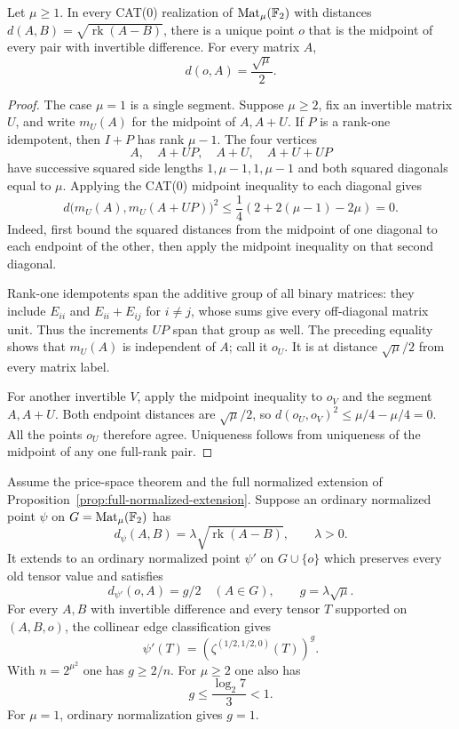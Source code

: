 \begin{lemma}
\label{lem:rank-metric-common-centre}
Let $\mu\ge1$. In every CAT(0) realization of
$\operatorname{Mat}_{\mu}(\mathbb F_2)$ with distances
$d(A,B)=\sqrt{\operatorname{rk}(A-B)}$, there is a unique point $o$
that is the midpoint of every pair with invertible difference.
For every matrix $A$,
\[
 d(o,A)=\frac{\sqrt\mu}{2}.
\]
\end{lemma}

\begin{proof}
The case $\mu=1$ is a single segment. Suppose $\mu\ge2$, fix an
invertible matrix $U$, and write $m_U(A)$ for the midpoint of
$A,A+U$. If $P$ is a rank-one idempotent, then $I+P$ has rank
$\mu-1$. The four vertices
\[
 A,\quad A+UP,\quad A+U,\quad A+U+UP
\]
have successive squared side lengths $1,\mu-1,1,\mu-1$ and both
squared diagonals equal to $\mu$. Applying the CAT(0) midpoint
inequality to each diagonal gives
\[
 d\bigl(m_U(A),m_U(A+UP)\bigr)^2
 \leq\frac14\left(2+2(\mu-1)-2\mu\right)=0.
\]
Indeed, first bound the squared distances from the midpoint of one
diagonal to each endpoint of the other, then apply the midpoint
inequality on that second diagonal.

Rank-one idempotents span the additive group of all binary matrices:
they include $E_{ii}$ and $E_{ii}+E_{ij}$ for $i\ne j$, whose sums
give every off-diagonal matrix unit. Thus the increments $UP$ span
that group as well. The preceding equality shows that $m_U(A)$ is
independent of $A$; call it $o_U$. It is at distance $\sqrt\mu/2$
from every matrix label.

For another invertible $V$, apply the midpoint inequality to $o_V$
and the segment $A,A+U$. Both endpoint distances are $\sqrt\mu/2$,
so $d(o_U,o_V)^2\leq\mu/4-\mu/4=0$. All the points $o_U$ therefore
agree. Uniqueness follows from uniqueness of the midpoint of any
one full-rank pair.
\end{proof}

\begin{proposition}
\label{prop:rank-centre-spectrum}
Assume the price-space theorem and the full normalized extension
of Proposition~\ref{prop:full-normalized-extension}. Suppose an
ordinary normalized point $\psi$ on
$G=\operatorname{Mat}_{\mu}(\mathbb F_2)$ has
\[
 d_\psi(A,B)=\lambda\sqrt{\operatorname{rk}(A-B)},\qquad\lambda>0.
\]
It extends to an ordinary normalized point $\psi'$ on $G\cup\{o\}$
which preserves every old tensor value and satisfies
\[
 d_{\psi'}(o,A)=g/2\quad(A\in G),\qquad g=\lambda\sqrt\mu.
\]
For every $A,B$ with invertible difference and every tensor $T$
supported on $(A,B,o)$, the collinear edge classification gives
\begin{equation}\label{eq:rank-centre-edge-values}
 \psi'(T)=\left(\zeta^{(1/2,1/2,0)}(T)\right)^g.
\end{equation}
With $n=2^{\mu^2}$ one has $g\ge2/n$. For $\mu\ge2$ one also has
\[
 g\le\frac{\log_2 7}{3}<1.
\]
For $\mu=1$, ordinary normalization gives $g=1$.
\end{proposition}


